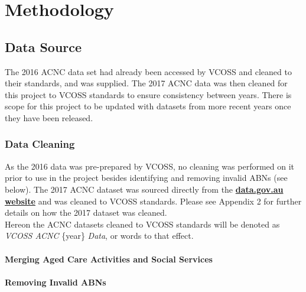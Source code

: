 \documentclass[
  11pt,
]{article}
\begin{document}
\newpage

\hypertarget{methodology}{%
\section{Methodology}\label{methodology}}

\hypertarget{data-source}{%
\subsection{Data Source}\label{data-source}}

The 2016 ACNC data set had already been accessed by VCOSS and cleaned to their standards, and was supplied. The 2017 ACNC data was then cleaned for this project to VCOSS standards to ensure consistency between years. There is scope for this project to be updated with datasets from more recent years once they have been released.

\hypertarget{data-cleaning}{%
\subsubsection{Data Cleaning}\label{data-cleaning}}

As the 2016 data was pre-prepared by VCOSS, no cleaning was performed on it prior to use in the project besides identifying and removing invalid ABNs (see below). The 2017 ACNC dataset was sourced directly from the \href{https://data.gov.au/dataset/ds-dga-a1f8626c-fefb-4c4d-86ea-deaa04fb1f6e/details?q=}{\textbf{data.gov.au website}} and was cleaned to VCOSS standards. Please see Appendix 2 for further details on how the 2017 dataset was cleaned.\\
Hereon the ACNC datasets cleaned to VCOSS standards will be denoted as \emph{VCOSS ACNC} \{year\} \emph{Data}, or words to that effect.

\hypertarget{merging-aged-care-activities-and-social-services}{%
\paragraph{Merging Aged Care Activities and Social Services}\label{merging-aged-care-activities-and-social-services}}

\hypertarget{removing-invalid-abns}{%
\paragraph{Removing Invalid ABNs}\label{removing-invalid-abns}}
\end{document}
